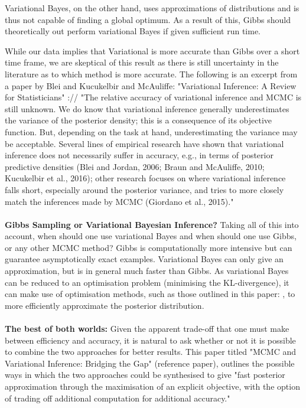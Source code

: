 \documentclass[10pt, a4paper, twocolumn]{article} %
\begin{document}
Variational Bayes, on the other hand, uses approximations of distributions and is thus not capable of finding a global optimum. As a result of this, Gibbs should theoretically out perform variational Bayes if given sufficient run time.

While our data implies that Variational is more accurate than Gibbs over a short time frame, we are skeptical of this result as there is still uncertainty in the literature as to which method is more accurate. The following is an excerpt from a paper by Blei and Kucukelbir and McAuliffe: "Variational Inference: A Review for Statisticians" \cite{Blei2017Review}://
"The relative accuracy of variational inference and MCMC is still unknown. We do know that variational inference generally underestimates the variance of the posterior density; this is a consequence of its objective function. But, depending on the task at hand, underestimating
the variance may be acceptable. Several lines of empirical research have shown that variational inference does not necessarily suffer in accuracy, e.g., in terms of posterior predictive densities (Blei and Jordan, 2006; Braun and McAuliffe, 2010; Kucukelbir et al., 2016); other research focuses on where variational inference falls short, especially around
the posterior variance, and tries to more closely match the inferences made by MCMC (Giordano et al., 2015)."\\
\\
\noindent\textbf{Gibbs Sampling or Variational Bayesian Inference?}
Taking all of this into account, when should one use variational Bayes and when should one use Gibbs, or any other MCMC method? Gibbs is computationally more intensive but can guarantee asymptotically exact examples. Variational Bayes can only give an approximation, but is in general much faster than Gibbs. As variational Bayes can be reduced to an optimisation problem (minimising the KL-divergence), it can make use of optimisation methods, such as those outlined in this paper: \cite{herbrich2005minimising}, to more efficiently approximate the posterior distribution.\\
\\
\noindent\textbf{The best of both worlds:}
Given the apparent trade-off that one must make between efficiency and accuracy, it is natural to ask whether or not it is possible to combine the two approaches for better results. This paper \cite{salimans2015markov} titled "MCMC and Variational Inference: Bridging the Gap" (reference paper), outlines the possible ways in which the two approaches could be synthesised to give "fast posterior approximation through the maximisation of an explicit objective, with the option of trading off additional computation for additional accuracy."




\printbibliography[title={Bibliography}] %


\end{document}
